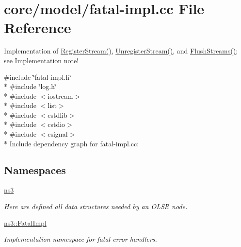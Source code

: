 \hypertarget{fatal-impl_8cc}{}\section{core/model/fatal-\/impl.cc File Reference}
\label{fatal-impl_8cc}


Implementation of \hyperlink{group__fatalimpl_gad552ca3d6d85b95147b8c6a2eb4d4579}{Register\+Stream()}, \hyperlink{group__fatalimpl_ga2bf70e98e990f01912527b4ccfac27d0}{Unregister\+Stream()}, and \hyperlink{group__fatalimpl_gad96fb19ef26235aaccd15e6d2a72382f}{Flush\+Streams()}; see Implementation note!  


{\ttfamily \#include \char`\"{}fatal-\/impl.\+h\char`\"{}}\\*
{\ttfamily \#include \char`\"{}log.\+h\char`\"{}}\\*
{\ttfamily \#include $<$iostream$>$}\\*
{\ttfamily \#include $<$list$>$}\\*
{\ttfamily \#include $<$cstdlib$>$}\\*
{\ttfamily \#include $<$cstdio$>$}\\*
{\ttfamily \#include $<$csignal$>$}\\*
Include dependency graph for fatal-\/impl.cc\+:
\subsection*{Namespaces}
\begin{DoxyCompactItemize}
\item 
 \hyperlink{namespacens3}{ns3}
\begin{DoxyCompactList}\small\item\em Here are defined all data structures needed by an O\+L\+SR node. \end{DoxyCompactList}\item 
 \hyperlink{namespacens3_1_1FatalImpl}{ns3\+::\+Fatal\+Impl}
\begin{DoxyCompactList}\small\item\em Implementation namespace for fatal error handlers. \end{DoxyCompactList}\end{DoxyCompactItemize}
